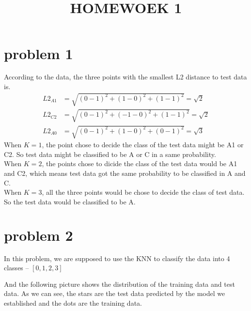 \documentclass[conference]{IEEEtran}
\begin{document}
\title{HOMEWOEK 1}

\author{
}

\maketitle

\section*{problem 1}
According to the data, the three points with the smallest L2 distance to test data is.
\[\begin{aligned}
    L2_{A1}&=\sqrt{(0-1)^2+(1-0)^2+(1-1)^2}=\sqrt{2}\\
    L2_{C2}&=\sqrt{(0-1)^2+(-1-0)^2+(1-1)^2}=\sqrt{2}\\
    L2_{A0}&=\sqrt{(0-1)^2+(1-0)^2+(0-1)^2}=\sqrt{3}
\end{aligned}\]
When $K=1$, the point chose to decide the class of the test data might be A1 or C2. So 
test data might be classified to be A or C in a same probability. \\
When $K=2$, the points chose to dicide the class of the test data would be A1 and C2,
which means test data got the same probability to be classified in A and C.\\
When $K=3$, all the three points would be chose to decide the class of test data. So the
test data would be classified to be A.

\section*{problem 2}
In this problem, we are supposed to use the KNN to classify
the data into 4 classes -- $[0,1,2,3]$

And the following picture shows the distribution of the 
training data and test data. As we can see, the stars 
are the test data predicted by the model we established
and the dots are the training data.
\end{document}
